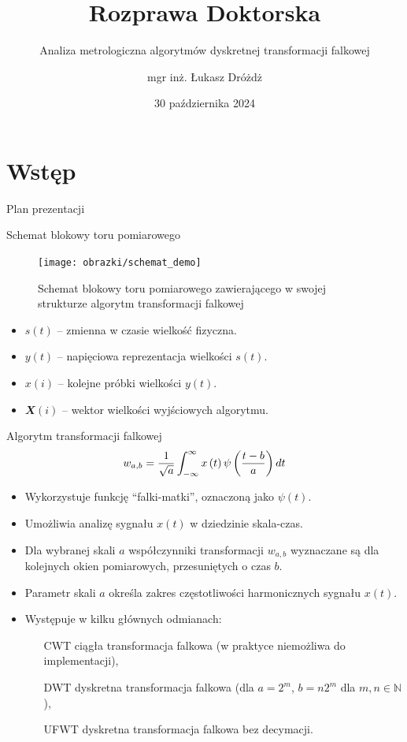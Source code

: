 \documentclass[12pt, polish, aspectratio = 169]{slides}
\title{Rozprawa Doktorska}
\author{mgr inż. Łukasz Dróżdż}
\subtitle{Analiza metrologiczna algorytmów dyskretnej transformacji falkowej}
\institute{Politechnika Śląska, Wydział Elektryczny \\ Katedra Metrologii, Elektroniki i Automatyki}
\date{30 października 2024}
\begin{document}
\section*{Wstęp}

\begin{frame}[plain]
\titlepage
\end{frame}

\begin{frame}{Plan prezentacji}
\tableofcontents
\end{frame}


\begin{frame}{Schemat blokowy toru pomiarowego}
\begin{figure}
\texttt{[image: obrazki/schemat\_demo]}
\caption{Schemat blokowy toru pomiarowego zawierającego w swojej strukturze algorytm transformacji falkowej}
\end{figure}
\begin{itemize}
\item $s(t)$ -- zmienna w czasie wielkość fizyczna.
\item $y(t)$ -- napięciowa reprezentacja wielkości $s(t)$.
\item $x(i)$ -- kolejne próbki wielkości $y(t)$.
\item $\mathbfit{X}(i)$ -- wektor wielkości wyjściowych algorytmu.
\end{itemize}
\end{frame}

\begin{frame}{Algorytm transformacji falkowej}
\begin{equation}
w_{a,b} = \frac{1}{\sqrt{a}} \int _{-\infty} ^{\infty} x \left(t\right) \psi \left(\frac{t-b}{a}\right) dt \label{eq:cwt}
\end{equation}
\begin{itemize}
\item Wykorzystuje funkcję \enquote{falki-matki}, oznaczoną jako $\psi(t)$.
\item Umożliwia analizę sygnału $x(t)$ w dziedzinie skala-czas.
\item Dla wybranej skali $a$ współczynniki transformacji $w_{a,b}$ wyznaczane są dla kolejnych okien pomiarowych, przesuniętych o czas $b$.
\item Parametr skali $a$ określa zakres częstotliwości harmonicznych sygnału $x(t)$.
\item Występuje w kilku głównych odmianach:
	\begin{itemize}
	\item[CWT] ciągła transformacja falkowa (w praktyce niemożliwa do implementacji),
	\item[DWT] dyskretna transformacja falkowa (dla $a = 2^m$, $b = n2^m$ dla $m, n \in \mathbb{N}$),
	\item[UFWT] dyskretna transformacja falkowa bez decymacji.
	\end{itemize}
\end{itemize}
\end{frame}
\end{document}
